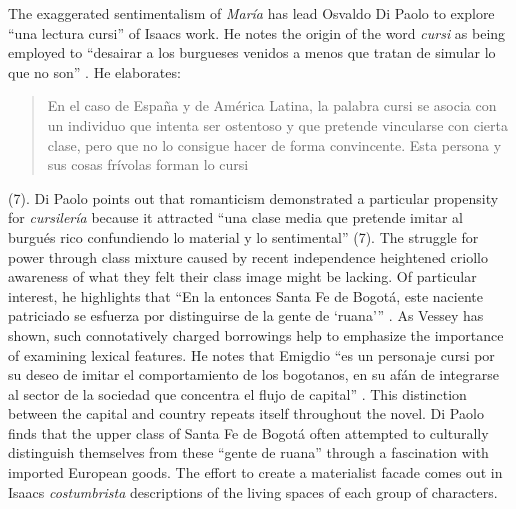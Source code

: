 \documentclass[12pt]{report}\usepackage[]{graphicx}\usepackage[]{color}
\begin{document}
\begin{spacing}{1.9}
The exaggerated sentimentalism of \textit{María} has lead Osvaldo Di Paolo to explore \enquote{una lectura cursi} of Isaacs work. 
He notes the origin of the word \textit{cursi} as being employed to \enquote{desairar a los burgueses venidos a menos que tratan de simular lo que no son} \autocite[7]{Paolo}. 
He elaborates: \blockquote{En el caso de España y de América Latina, la palabra cursi se asocia con un individuo que intenta ser ostentoso y que pretende vincularse con cierta clase, pero que no lo consigue hacer de forma convincente. Esta persona y sus cosas frívolas forman lo cursi} (7). 
Di Paolo points out that romanticism demonstrated a particular propensity for \textit{cursilería} because it attracted \enquote{una clase media que pretende imitar al burgués rico confundiendo lo material y lo sentimental} (7).
The struggle for power through class mixture caused by recent independence heightened criollo awareness of what they felt their class image might be lacking.
Of particular interest, he highlights that \enquote{En la entonces Santa Fe de Bogotá, este naciente patriciado se esfuerza por distinguirse de la gente de \enquote{ruana}} \autocite[8]{Paolo}. 
As Vessey has shown, such connotatively charged borrowings help to emphasize the importance of examining lexical features.
He notes that Emigdio \enquote{es un personaje cursi por su deseo de imitar el comportamiento de los bogotanos, en su afán de integrarse al sector de la sociedad que concentra el flujo de capital} \autocite[9]{Paolo}. 
This distinction between the capital and country repeats itself throughout the novel.
Di Paolo finds that the upper class of Santa Fe de Bogotá often attempted to culturally distinguish themselves from these \enquote{gente de ruana} through a fascination with imported European goods.
The effort to create a materialist facade comes out in Isaacs \textit{costumbrista} descriptions of the living spaces of each group of characters.


\end{spacing}
\end{document}
